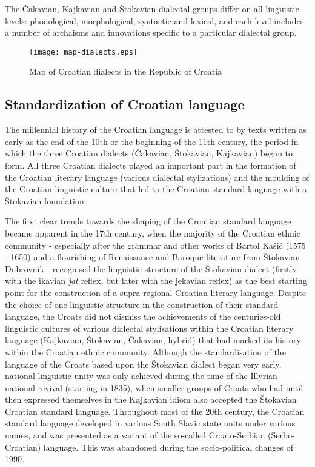 \begin{multicols}{2}
The Čakavian, Kajkavian and Štokavian dialectal groups differ on all linguistic levels: phonological, morphological, syntactic and lexical, and each level includes a number of archaisms and innovations specific to a particular dialectal group.

\begin{figure*}[htb]
  \center
  \texttt{[image: map-dialects.eps]}
  \caption{Map of Croatian dialects in the Republic of Croatia}
  \label{fig:dijalekti_en}
\end{figure*}


\subsection{Standardization of Croatian language}

The millennial history of the Croatian language is attested to by texts written as early as the end of the 10th or the beginning of the 11th century, the period in which the three Croatian dialects (Čakavian, Štokavian, Kajkavian) began to form. All three Croatian dialects played an important part in the formation of the Croatian literary language (various dialectal stylizations) and the moulding of the Croatian linguistic culture that led to the Croatian standard language with a Štokavian foundation.


The first clear trends towards the shaping of the Croatian standard language became apparent in the 17th century, when the majority of the Croatian ethnic community - especially after the grammar and other works of Bartol Kašić (1575 - 1650) and a flourishing of Renaissance and Baroque literature from Štokavian Dubrovnik - recognised the linguistic structure of the Štokavian dialect (firstly with the ikavian \emph{jat} reflex, but later with the jekavian reflex) as the best starting point for the construction of a supra-regional Croatian literary language. Despite the choice of one linguistic structure in the construction of their standard language, the Croats did not dismiss the achievements of the centuries-old linguistic cultures of various dialectal stylisations within the Croatian literary language (Kajkavian, Štokavian, Čakavian, hybrid) that had marked its history within the Croatian ethnic community. Although the standardisation of the language of the Croats based upon the Štokavian dialect began very early, national linguistic unity was only achieved during the time of the Illyrian national revival (starting in 1835), when smaller groups of Croats who had until then expressed themselves in the Kajkavian idiom also accepted the Štokavian Croatian standard language. Throughout most of the 20th century, the Croatian standard language developed in various South Slavic state units under various names, and was presented as a variant of the so-called Croato-Serbian (Serbo-Croatian) language. This was abandoned during the socio-political changes of 1990.


\end{multicols}
